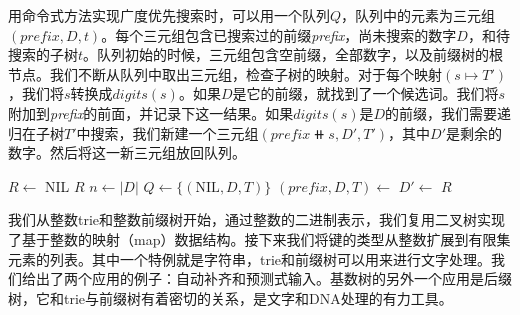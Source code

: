 \documentclass[b5paper]{ctexart}
\begin{document}
用命令式方法实现广度优先搜索时，可以用一个队列$Q$，队列中的元素为三元组$(\textit{prefix}, D, t)$。每个三元组包含已搜索过的前缀\textit{prefix}，尚未搜索的数字$D$，和待搜索的子树$t$。队列初始的时候，三元组包含空前缀，全部数字，以及前缀树的根节点。我们不断从队列中取出三元组，检查子树的映射。对于每个映射$(s \mapsto T')$，我们将$s$转换成$digits(s)$。如果$D$是它的前缀，就找到了一个候选词。我们将$s$附加到\textit{prefix}的前面，并记录下这一结果。如果$digits(s)$是$D$的前缀，我们需要递归在子树$T'$中搜索，我们新建一个三元组$(\textit{prefix} \doubleplus s, D', T')$，其中$D'$是剩余的数字。然后将这一新三元组放回队列。

\begin{algorithmic}[1]
  \State $R \gets $ NIL
    \State \Return $R$
  \EndIf
  \State $n \gets |D|$
  \State $Q \gets \{(\text{NIL}, D, T)\}$
    \State $(\textit{prefix}, D, T) \gets$ 
      \State $D' \gets$ 
       
        \State {} 
        \State {}
      \EndIf
    \EndFor
  \EndWhile
  \State \Return $R$
\EndFunction
\end{algorithmic}

我们从整数trie和整数前缀树开始，通过整数的二进制表示，我们复用二叉树实现了基于整数的映射（map）数据结构。接下来我们将键的类型从整数扩展到有限集元素的列表。其中一个特例就是字符串，trie和前缀树可以用来进行文字处理。我们给出了两个应用的例子：自动补齐和预测式输入。基数树的另外一个应用是后缀树，它和trie与前缀树有着密切的关系，是文字和DNA处理的有力工具。

\begin{Exercise}[label={ex:prefix-tree-app}]
\end{Exercise}
\end{document}
